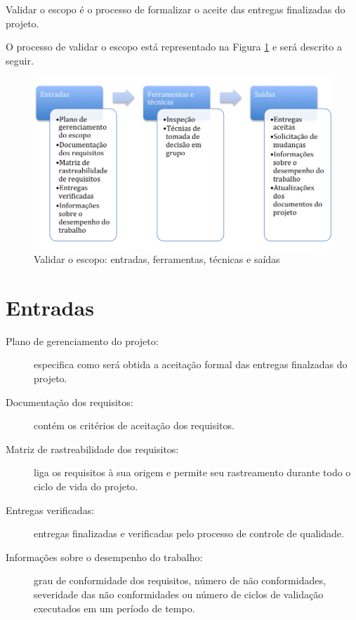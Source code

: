 
Validar o escopo é o processo de formalizar o aceite das entregas finalizadas do projeto.

O processo de validar o escopo está representado na Figura \ref{fig:escopo:validar:efts} e será descrito a seguir.

\begin{figure}[!h]
	\centering
	\includegraphics[scale=0.5]{Figuras/escopo_efts_verificar.png}
	\caption{Validar o escopo: entradas, ferramentas, técnicas e saídas}
	\label{fig:escopo:validar:efts}
\end{figure}

\section{Entradas}

\begin{description}
	
	\item[Plano de gerenciamento do projeto:] especifica como será obtida a aceitação formal das entregas finalzadas do projeto.
	
	\item[Documentação dos requisitos:] contém os critérios de aceitação dos requisitos.
	
	\item[Matriz de rastreabilidade dos requisitos:] liga os requisitos à sua origem e permite seu rastreamento durante todo o ciclo de vida do projeto. 
	
	\item[Entregas verificadas:] entregas finalizadas e verificadas pelo processo de controle de qualidade.
	
	\item[Informações sobre o desempenho do trabalho:] grau de conformidade dos requisitos, número de não conformidades, severidade das não conformidades ou número de ciclos de validação executados em um período de tempo.
	
\end{description}

